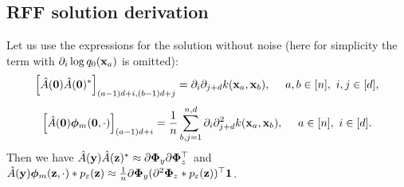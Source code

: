 \subsection{RFF solution derivation}
\label{sec:rff_solution_derivation}
Let us use the expressions for the solution without noise
(here for simplicity the term with $\partial_i \log q_0({\bf x}_a)$ is omitted):
\begin{equation*}
    \left [ \hat{A}({\bf 0})\hat{A}({\bf 0})^* \right ]_{(a - 1)d + i, (b - 1)d + j} =
    \partial_i\partial_{j + d}k({\bf x}_a, {\bf x}_b),~\quad a, b \in [n],~i, j \in [d],
\end{equation*}
\begin{equation*}
    \left [ \hat{A}({\bf 0}){\bm \phi}_m({\bf 0}, \cdot) \right ]_{(a - 1)d + i} =
    \frac{1}{n}\sum_{b, j = 1}^{n, d}\partial_i\partial^2_{j + d}k({\bf x}_a, {\bf x}_b),~\quad a\in [n],~i \in [d].
\end{equation*}
Then we have
$\hat{A}({\bf y})\hat{A}({\bf z})^* \approx \partial{\bm \Phi}_y\partial{\bm \Phi}_z^{\top}$
and
$\hat{A}({\bf y}){\bm \phi}_m({\bf z}, \cdot) * p_{\varepsilon}({\bf z}) \approx \frac{1}{n}
\partial{\bm \Phi}_y(\partial^2{\bm \Phi}_z * p_{\varepsilon}({\bf z}))^{\top}{\bf 1}$.

